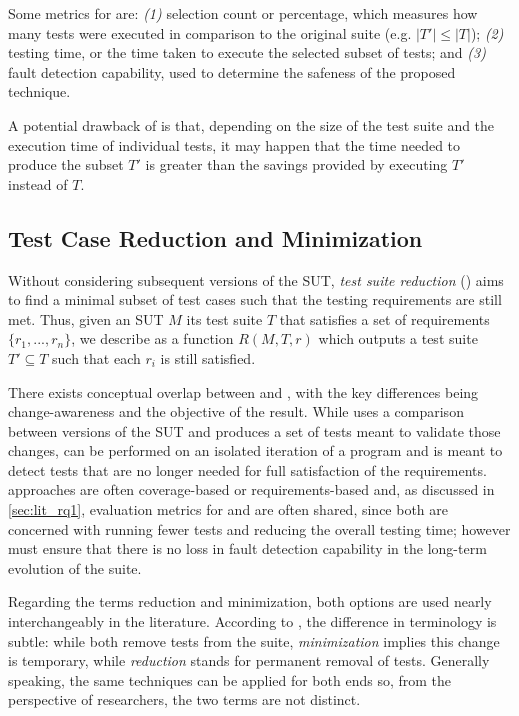 Some metrics for \tcs are: \textit{(1)} selection count or percentage, which measures how many tests were executed in comparison to the original suite (e.g. $|T'| \leq |T|$); \textit{(2)} testing time, or the time taken to execute the selected subset of tests; and \textit{(3)} fault detection capability, used to determine the safeness of the proposed technique.

A potential drawback of \tcs is that, depending on the size of the test suite and the execution time of individual tests, it may happen that the time needed to produce the subset $T'$ is greater than the savings provided by executing $T'$ instead of $T$. 

\subsection{Test Case Reduction and Minimization}
\label{sec:tsr}

Without considering subsequent versions of the SUT, \textit{test suite reduction} (\tsr) aims to find a minimal subset of test cases such that the testing requirements are still met.
Thus, given an SUT $M$ its test suite $T$ that satisfies a set of requirements $\{r_1, ..., r_n\}$, we describe \tsr as a function $R(M, T, r)$ which outputs a test suite $T' \subseteq T$ such that each $r_i$ is still satisfied.

There exists conceptual overlap between \tcs and \tsr, with the key differences being change-awareness and the objective of the result.
While \tcs uses a comparison between versions of the SUT and produces a set of tests meant to validate those changes, \tsr can be performed on an isolated iteration of a program and is meant to detect tests that are no longer needed for full satisfaction of the requirements.
\tsr approaches are often coverage-based or requirements-based and, as discussed in \autoref{sec:lit_rq1}, evaluation metrics for \tcp and \tsr are often shared, since both are concerned with running fewer tests and reducing the overall testing time; however \tsr must ensure that there is no loss in fault detection capability in the long-term evolution of the suite.

Regarding the terms reduction and minimization, both options are used nearly interchangeably in the literature.
According to \citeauthor{yoo2012regression}, the difference in terminology is subtle: while both remove tests from the suite, \textit{minimization} implies this change is temporary, while \textit{reduction} stands for permanent removal of tests.
Generally speaking, the same techniques can be applied for both ends so, from the perspective of researchers, the two terms are not distinct.

